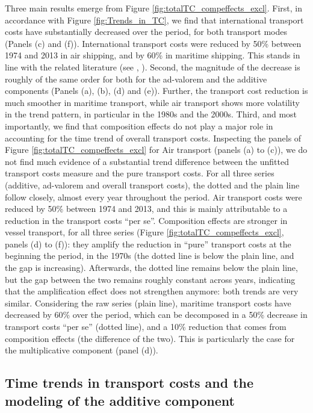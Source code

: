 \documentclass[a4paper,11pt]{article}
\begin{document}
Three main results emerge from Figure \ref{fig:totalTC_compeffects_excl}.
First, in accordance with Figure \ref{fig:Trends_in_TC}, we find that international transport costs have substantially decreased over the period, for both transport modes (Panels (c) and (f)).
International transport costs were reduced by 50\% between 1974 and 2013 in air shipping, and by 60\% in maritime shipping.
This stands in line with the related literature (see \citealp{Hummels_1999}, \citealp{Lafourcade_Thisse}).
Second, the magnitude of the decrease is roughly of the same order for both for the ad-valorem and the additive components (Panels (a), (b), (d) and (e)).
Further, the transport cost reduction is much smoother in maritime transport, while air transport shows more volatility in the trend pattern, in particular in the 1980s and the 2000s.
Third, and most importantly, we find that composition effects do not play a major role in accounting for the time trend of overall transport costs.
Inspecting the panels of Figure \ref{fig:totalTC_compeffects_excl} for Air transport (panels (a) to (c)), we do not find much evidence of a substantial trend difference between the unfitted transport costs measure and the pure transport costs.
For all three series (additive, ad-valorem and overall transport costs), the dotted and the plain line follow closely, almost every year throughout the period.
Air transport costs were reduced by 50\% between 1974 and 2013, and this is mainly attributable to a reduction in the transport costs ``per se''.
Composition effects are stronger in vessel transport, for all three series (Figure \ref{fig:totalTC_compeffects_excl}, panels (d) to (f)): they amplify the reduction in ``pure'' transport costs at the beginning the period, in the 1970s (the dotted line is below the plain line, and the gap is increasing). Afterwards, the dotted line remains below the plain line, but the gap between the two remains roughly constant across years, indicating that the amplification effect does not strengthen anymore: both trends are very similar.
Considering the raw series (plain line), maritime transport costs have decreased by 60\% over the period, which can be decomposed in a 50\% decrease in transport costs ``per se'' (dotted line), and a 10\% reduction that comes from composition effects (the difference of the two).
This is particularly the case for the multiplicative component (panel (d)).\smallskip




\subsection{Time trends in transport costs and the modeling of the additive component}
\end{document}
